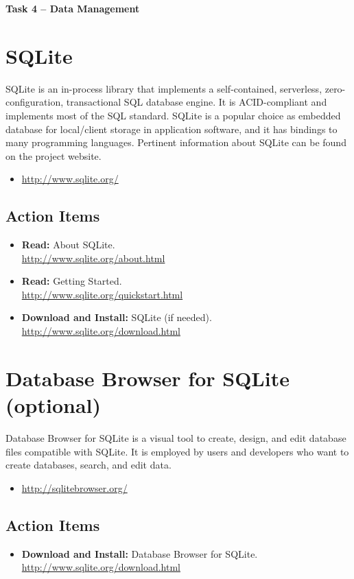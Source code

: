 \documentclass[11pt]{article}
\begin{document}
\begin{center}
{\bfseries \LARGE Task 4 -- Data Management\\[8mm]}
\end{center}


\section{SQLite}

SQLite is an in-process library that implements a self-contained, serverless, zero-configuration, transactional SQL database engine.
It is ACID-compliant and implements most of the SQL standard.
SQLite is a popular choice as embedded database for local/client storage in application software, and it has bindings to many programming languages.
Pertinent information about SQLite can be found on the project website.
\begin{itemize}
\item \url{http://www.sqlite.org/}
\end{itemize}


\subsection*{Action Items}

\begin{itemize}
\item \textbf{Read:} About SQLite. \\
\url{http://www.sqlite.org/about.html}
\item \textbf{Read:} Getting Started. \\
\url{http://www.sqlite.org/quickstart.html}
\item \textbf{Download and Install:} SQLite (if needed). \\
\url{http://www.sqlite.org/download.html}
\end{itemize}


\section{Database Browser for SQLite (optional)}

Database Browser for SQLite is a visual tool to create, design, and edit database files compatible with SQLite.
It is employed by users and developers who want to create databases, search, and edit data.
\begin{itemize}
\item \url{http://sqlitebrowser.org/}
\end{itemize}

\subsection*{Action Items}

\begin{itemize}
\item \textbf{Download and Install:} Database Browser for SQLite. \\
\url{http://www.sqlite.org/download.html}
\end{itemize}
\end{document}
